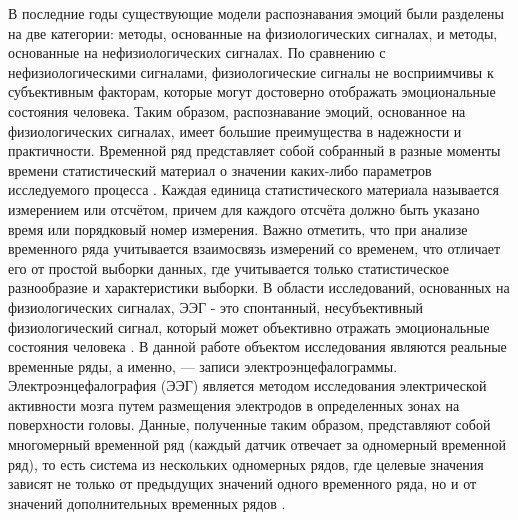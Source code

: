 \documentclass{article}
\begin{document}
В последние годы существующие модели распознавания эмоций были разделены на две категории: методы, основанные на физиологических сигналах, и методы, основанные на нефизиологических сигналах. По сравнению с нефизиологическими сигналами, физиологические сигналы не восприимчивы к субъективным факторам, которые могут достоверно отображать эмоциональные состояния человека. Таким образом, распознавание эмоций, основанное на физиологических сигналах, имеет большие преимущества в надежности и практичности\citep{sensors}. Временной ряд представляет собой собранный в разные моменты времени статистический материал о значении каких-либо параметров исследуемого процесса \citep{time_series}. Каждая единица статистического материала называется измерением или отсчётом, причем для каждого отсчёта должно быть указано время или порядковый номер измерения. Важно отметить, что при анализе временного ряда учитывается взаимосвязь измерений со временем, что отличает его от простой выборки данных, где учитывается только статистическое разнообразие и характеристики выборки. В области исследований, основанных на физиологических сигналах, ЭЭГ - это спонтанный, несубъективный физиологический сигнал, который может объективно отражать эмоциональные состояния человека \citep{eeg}. В данной работе объектом исследования являются реальные временные ряды, а именно, — записи электроэнцефалограммы. Электроэнцефалография (ЭЭГ) является методом исследования электрической активности мозга путем размещения электродов в определенных зонах на поверхности головы. Данные, полученные таким образом, представляют собой многомерный временной ряд (каждый датчик отвечает за одномерный временной ряд), то есть система из нескольких одномерных рядов, где целевые значения зависят не только от предыдущих значений одного временного ряда, но и от значений дополнительных временных рядов \citep{seed}.
\end{document}

